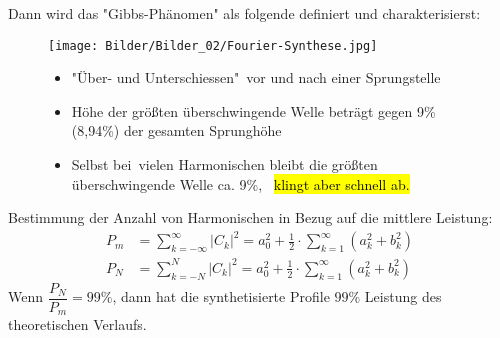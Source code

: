 Dann wird das "Gibbs-Phänomen" als folgende definiert und charakterisierst:

\begin{figure}[H]
    \centering
    \begin{minipage}[c]{.5\linewidth}
    \centering
        \texttt{[image: Bilder/Bilder\_02/Fourier-Synthese.jpg]}
    \end{minipage}
    \begin{minipage}[c]{.4\linewidth}
        \begin{itemize}
            \item
            "Über- und Unterschiessen"\, vor und nach einer Sprungstelle
            \item
            Höhe der größten überschwingende Welle beträgt gegen 9\% (8,94\%) der gesamten Sprunghöhe
            \item
            Selbst bei \infty \,vielen Harmonischen bleibt die größten überschwingende Welle ca. 9\%, \, \hl{klingt aber schnell ab.}
        \end{itemize}
    \end{minipage}
\end{figure}

Bestimmung der Anzahl von Harmonischen in Bezug auf die mittlere Leistung:
\begin{equation}
    \begin{aligned}
        P_m&=\sum_{k=-\infty}^{\infty }\left | C_k \right |^2=a_0^2+\frac{1}{2}\cdot \sum_{k=1}^{\infty}\left ( a_k^2+b_k^2\right)\\
        P_N&=\sum_{k=-N}^{N}\left | C_k \right |^2=a_0^2+\frac{1}{2}\cdot \sum_{k=1}^{\infty}\left ( a_k^2+b_k^2\right)  
    \end{aligned}
\end{equation}
Wenn $\dfrac{P_N}{P_m}=99\%$, dann hat die synthetisierte Profile $99\%$ Leistung des theoretischen Verlaufs.

